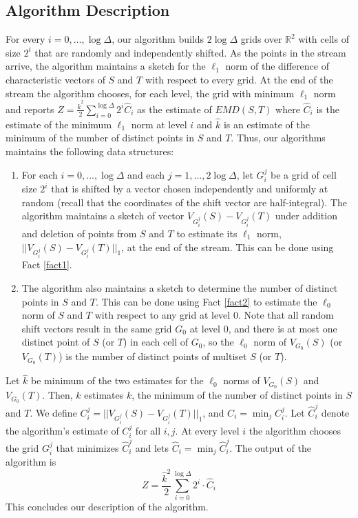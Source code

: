 \documentclass[oribibl]{llncs}
\begin{document}
\subsection{Algorithm Description}
For every $i=0,\ldots,\log\Delta$, our algorithm builds 
$2\log\Delta$ grids over $\mathbb{R}^2$ with cells of size $2^i$
that are randomly and independently shifted. 
As the points in the stream arrive, the algorithm maintains a sketch for
the $\ell_1$ norm of the difference of characteristic vectors of $S$ and $T$
with respect to every grid. At the end of the stream the algorithm chooses, for
each level, the grid with minimum $\ell_1$ norm and reports
$Z = \frac{{\widehat{k}}^2}{2}\sum_{i = 0}^{\log\Delta}2^i\widehat{C}_i$
as the estimate of $EMD(S,T)$ where $\widehat{C}_i$ is the estimate of
the minimum $\ell_1$ norm at level $i$ and $\widehat{k}$ is an estimate
of the minimum of the number of distinct points in $S$ and $T$.
Thus, our algorithms maintains the following data structures:
\begin{enumerate}
 \item For each $i=0,\ldots,\log\Delta$ and each
$j = 1, \ldots, 2\log\Delta$, let $G_i^j$ be a grid of cell size
$2^i$ that is shifted by a vector chosen independently and
uniformly at random
(recall that the coordinates of the shift vector are half-integral).
The algorithm maintains a sketch of vector
$V_{G_i^j}(S)-V_{G_i^j}(T)$ under addition and deletion of points from
$S$ and $T$ to estimate its $\ell_1$ norm,
$||V_{G_i^j}(S)-V_{G_i^j}(T)||_1$, at the 
end of the stream. This can be done using Fact \ref{fact1}.
 \item The algorithm also maintains a sketch to determine the number of distinct
points in $S$ and $T$. This can be done using Fact \ref{fact2}
to estimate the $\ell_0$ norm of $S$ and $T$ with respect to any grid
at level $0$.
Note that all random shift vectors result in the same grid $G_0$ at level $0$, 
and there is at most one distinct point of $S$ (or $T$) in each cell of
$G_0$, so the $\ell_0$ norm of $V_{G_0}(S)$ (or $V_{G_0}(T)$) is the number of
distinct points of multiset $S$ (or $T$).  
\end{enumerate}

Let $\widehat{k}$ be minimum of the two estimates for the $\ell_0$ norms of
$V_{G_0}(S)$ and $V_{G_0}(T)$. Then, $\widehat{k}$ estimates $k$,
the minimum of the number of distinct points in $S$ and $T$. 
We define $C_i^j=||V_{G_i^j}(S)-V_{G_i^j}(T)||_1$, and $C_i =\min_j C_i^j$.
Let $\widehat{C}_i^j$ denote the algorithm's estimate of $C_i^j$ for all $i,j$.
At every level $i$ the algorithm chooses the grid $G_i^j$ that minimizes
$\widehat{C}_i^j$ and lets $\widehat{C}_i = \min_j{\widehat{C}_i^j}$.
The output of the algorithm is 
\begin{equation}
 Z = \frac{\widehat{k}^2}{2}\sum_{i = 0}^{\log\Delta}2^i\cdot \widehat{C}_i
\end{equation}
This concludes our description of the algorithm.
\end{document}
